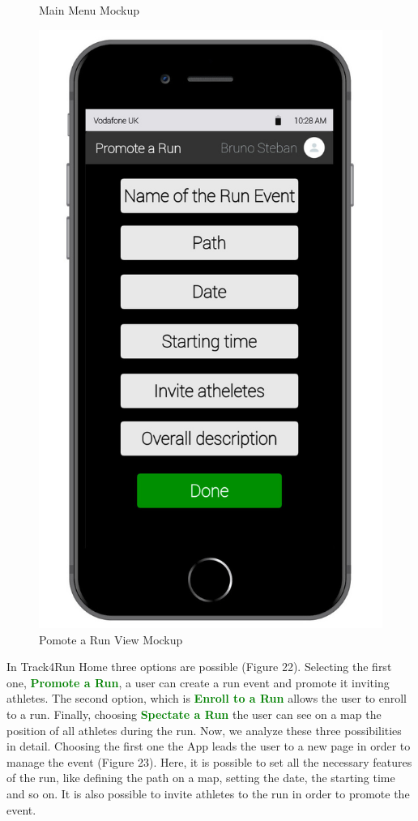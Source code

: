 \begin{enumerate}
\begin{figure}[H]
\begin{center}
\begin{minipage}[c]{.40\textwidth}
	\caption{Main Menu Mockup}
        \end{minipage}%
        \hspace{10mm}%
        \begin{minipage}[c]{.40\textwidth}
        \centering
          \includegraphics[height=14 cm]{Images/Mockups/Track4RunMockup6.jpg}
	\caption{Pomote a Run View Mockup}
        \end{minipage}
      \end{center}
\end{figure}
In Track4Run Home three options are possible (Figure 22). Selecting the first one, {\textcolor{Green}{\textbf{Promote a Run}}}, a user can create a run event and promote it inviting athletes. The second option, which is {\textcolor{Green}{\textbf{Enroll to a Run}}} allows the user to enroll to a run. Finally, choosing {\textcolor{Green}{\textbf{Spectate a Run}}} the user can see on a map the position of all athletes during the run. Now, we analyze these three possibilities in detail. Choosing the first one the App leads the user to a new page in order to manage the event (Figure 23). Here, it is possible to set all the necessary features of the run, like defining the path on a map, setting the date, the starting time and so on. It is also possible to invite athletes to the run in order to promote the event.

\end{enumerate}
